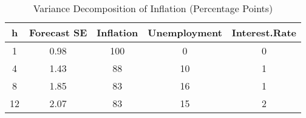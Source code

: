 \begin{table}[ht]
\centering
\caption{Variance Decomposition of Inflation (Percentage Points)} 
\label{tab:VD-1}
\begin{tabular}{|c|c|ccc|}
  \hline
h & Forecast SE & Inflation & Unemployment & Interest.Rate \\ 
  \hline
1 & 0.98 & 100 & 0 & 0 \\ 
  4 & 1.43 & 88 & 10 & 1 \\ 
  8 & 1.85 & 83 & 16 & 1 \\ 
  12 & 2.07 & 83 & 15 & 2 \\ 
   \hline
\end{tabular}
\end{table}
